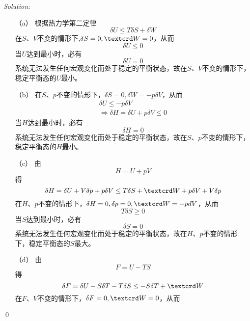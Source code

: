 \documentclass[12pt,a4paper]{article}
\newenvironment{sol}
    {\emph{Solution:}
    }
    {
    \qed
    }
\begin{document}
\begin{sol}
\begin{itemize}
\item[（a）] 根据热力学第二定律
\begin{equation}
\delta U\leq T\delta S+\delta W
\end{equation}
在$S$、$V$不变的情形下,$\delta S=0,\text{\textcrd}W=0$，从而
\begin{equation}
\delta U\leq0
\end{equation}
当$U$达到最小时，必有
\begin{equation}
\delta U=0
\end{equation}
系统无法发生任何宏观变化而处于稳定的平衡状态，故在$S$、$V$不变的情形下，稳定平衡态的$U$最小。
\item[（b）] 在$S$、$p$不变的情形下，$\delta S=0,\delta W=-p\delta V$，从而
\begin{gather}
\delta U\leq-p\delta V\\
\Longrightarrow\delta H=\delta U+p\delta V\leq 0
\end{gather}
当$H$达到最小时，必有
\begin{equation}
\delta H=0
\end{equation}
系统无法发生任何宏观变化而处于稳定的平衡状态，故在$S$、$p$不变的情形下，稳定平衡态的$H$最小。
\item[（c）] 由
\begin{equation}
H=U+pV
\end{equation}
得
\begin{equation}
\delta H=\delta U+V\delta p+p\delta V\leq T\delta S+\text{\textcrd}W+p\delta V+V\delta p
\end{equation}
在$H$、$p$不变的情形下，$\delta H=0,\delta p=0,\text{\textcrd}W=-pdV$，从而
\begin{equation}
T\delta S\geq0
\end{equation}
当$S$达到最小时，必有
\begin{equation}
\delta S=0
\end{equation}
系统无法发生任何宏观变化而处于稳定的平衡状态，故在$H$、$p$不变的情形下，稳定平衡态的$S$最大。
\item[（d）] 由
\begin{equation}
F=U-TS
\end{equation}
得
\begin{equation}
\delta F=\delta U-S\delta T-T\delta S\leq -S\delta T+\text{\textcrd}W
\end{equation}
在$F$、$V$不变的情形下，$\delta F=0,\text{\textcrd}W=0$，从而
\begin{equation}

\end{equation}
\end{itemize}
\end{sol}
\end{document}
